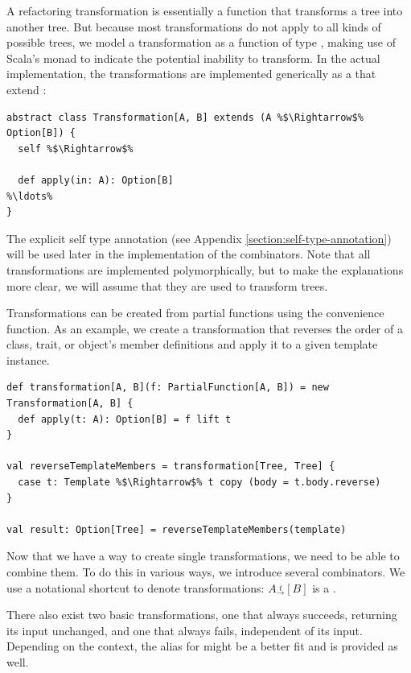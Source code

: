 A refactoring transformation is essentially a function that transforms a tree into another tree. But because most transformations do not apply to all kinds of possible trees, we model a transformation as a function of type , making use of Scala's  monad to indicate the potential inability to transform. In the actual implementation, the transformations are implemented generically as a  that extend :

\begin{lstlisting}
abstract class Transformation[A, B] extends (A %$\Rightarrow$% Option[B]) {
  self %$\Rightarrow$%

  def apply(in: A): Option[B]
%\ldots%
}
\end{lstlisting}

The explicit self type annotation (see Appendix \vref{section:self-type-annotation}) will be used later in the implementation of the combinators. Note that all transformations are implemented polymorphically, but to make the explanations more clear, we will assume that they are used to transform trees.

Transformations can be created from partial functions using the  convenience function. As an example, we create a transformation that reverses the order of a class, trait, or object's member definitions and apply it to a given template instance.

\begin{lstlisting}
def transformation[A, B](f: PartialFunction[A, B]) = new Transformation[A, B] {
  def apply(t: A): Option[B] = f lift t
}

val reverseTemplateMembers = transformation[Tree, Tree] {
  case t: Template %$\Rightarrow$% t copy (body = t.body.reverse)
}

val result: Option[Tree] = reverseTemplateMembers(template)
\end{lstlisting}

Now that we have a way to create single transformations, we need to be able to combine them. To do this in various ways, we introduce several combinators. We use a notational shortcut to denote transformations: $A \overset{t}{_\rightarrow} [B]$ is a .

There also exist two basic transformations, one that always succeeds, returning its input unchanged, and one that always fails, independent of its input. Depending on the context, the alias  for  might be a better fit and is provided as well.

